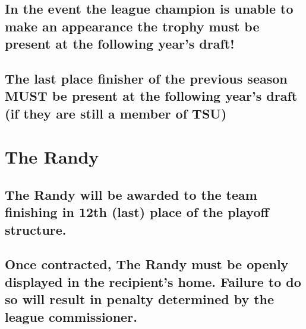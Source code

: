 \documentclass[]{book}
\begin{document}
\hypertarget{in-the-event-the-league-champion-is-unable-to-make-an-appearance-the-trophy-must-be-present-at-the-following-years-draft}{%
\subsection{In the event the league champion is unable to make an appearance the trophy must be present at the following year's draft!}\label{in-the-event-the-league-champion-is-unable-to-make-an-appearance-the-trophy-must-be-present-at-the-following-years-draft}}

\hypertarget{the-last-place-finisher-of-the-previous-season-must-be-present-at-the-following-years-draft-if-they-are-still-a-member-of-tsu}{%
\subsection{The last place finisher of the previous season MUST be present at the following year's draft (if they are still a member of TSU)}\label{the-last-place-finisher-of-the-previous-season-must-be-present-at-the-following-years-draft-if-they-are-still-a-member-of-tsu}}

\hypertarget{the-randy}{%
\section{The Randy}\label{the-randy}}

\hypertarget{the-randy-will-be-awarded-to-the-team-finishing-in-12th-last-place-of-the-playoff-structure.}{%
\subsection{The Randy will be awarded to the team finishing in 12th (last) place of the playoff structure.}\label{the-randy-will-be-awarded-to-the-team-finishing-in-12th-last-place-of-the-playoff-structure.}}

\hypertarget{once-contracted-the-randy-must-be-openly-displayed-in-the-recipients-home.-failure-to-do-so-will-result-in-penalty-determined-by-the-league-commissioner.}{%
\subsection{Once contracted, The Randy must be openly displayed in the recipient's home. Failure to do so will result in penalty determined by the league commissioner.}\label{once-contracted-the-randy-must-be-openly-displayed-in-the-recipients-home.-failure-to-do-so-will-result-in-penalty-determined-by-the-league-commissioner.}}
\end{document}

